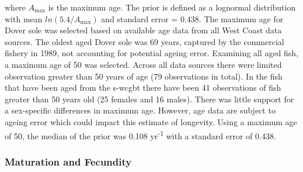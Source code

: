 \documentclass[11pt,
  english,
  a4paper,
]{article}
\begin{document}
\vspace{0.5cm}


where {\(A_{\text{max}}\)\leavevmode\tagmcend\tagstructend} is the maximum age. The prior is defined as a lognormal distribution with mean {\(ln(5.4/A_{\text{max}})\)\leavevmode\tagmcend\tagstructend} and standard error = 0.438. The maximum age for Dover sole was selected based on available age data from all West Coast data sources. The oldest aged Dover sole was 69 years, captured by the commercial fishery in 1989, not accounting for potential ageing error. Examining all aged fish, a maximum age of 50 was selected. Across all data sources there were limited observation greater than 50 years of age (79 observations in total). In the fish that have been aged from the \gls{s-wcgbt} there have been 41 observations of fish greater than 50 years old (25 females and 16 males). There was little support for a sex-specific differences in maximum age. However, age data are subject to ageing error which could impact this estimate of longevity. Using a maximum age of 50, the median of the prior was 0.108 yr\textsuperscript{-1} with a standard error of 0.438.

\leavevmode\tagmcend\tagstructend\par


\hypertarget{maturation-and-fecundity}{%
\subsubsection{Maturation and Fecundity}\label{maturation-and-fecundity}}

\leavevmode\tagmcend\tagstructend

\end{document}
